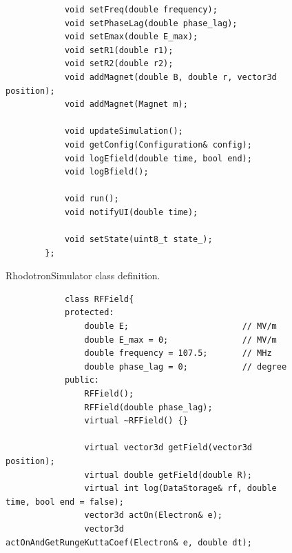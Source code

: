 \documentclass[a4paper,oneside,12pt]{report}
\numberwithin{equation}{chapter}
\begin{document}
{\begin{figure}[H]
\begin{verbatim}
            void setFreq(double frequency);
            void setPhaseLag(double phase_lag);
            void setEmax(double E_max);
            void setR1(double r1);
            void setR2(double r2);
            void addMagnet(double B, double r, vector3d position);
            void addMagnet(Magnet m);
            
            void updateSimulation();
            void getConfig(Configuration& config);
            void logEfield(double time, bool end);
            void logBfield();

            void run();
            void notifyUI(double time);

            void setState(uint8_t state_);
        };
    \end{verbatim}
    \vspace{20pt}
    \caption{RhodotronSimulator class definition.}
    \label{fig:rhodosim_class}
\end{figure}

\begin{figure}[H]
    \begin{minipage}{\textwidth}
        \begin{verbatim}
            class RFField{
            protected:
                double E;                       // MV/m
                double E_max = 0;               // MV/m
                double frequency = 107.5;       // MHz
                double phase_lag = 0;           // degree
            public:
                RFField();
                RFField(double phase_lag);
                virtual ~RFField() {}

                virtual vector3d getField(vector3d position);              
                virtual double getField(double R);
                virtual int log(DataStorage& rf, double time, bool end = false);
                vector3d actOn(Electron& e);    
                vector3d actOnAndGetRungeKuttaCoef(Electron& e, double dt);                  
                

\end{verbatim}
\end{minipage}
\end{figure}}
\end{document}

